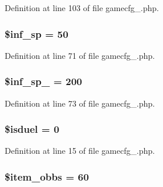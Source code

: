 Definition at line 103 of file gamecfg\+\_.\+php.

\hypertarget{gamecfg__1_8php_ad018a98e2b1be069c9d6427efdb07247}{
\subsubsection[{\$inf\+\_\+sp}]{\setlength{\rightskip}{0pt plus 5cm}\$inf\+\_\+sp = 50}}\label{gamecfg__1_8php_ad018a98e2b1be069c9d6427efdb07247}


Definition at line 71 of file gamecfg\+\_.\+php.

\hypertarget{gamecfg__1_8php_ad873d3b143c0a4744aee90f33c76ef9c}{
\subsubsection[{\$inf\+\_\+sp\+\_\+2}]{\setlength{\rightskip}{0pt plus 5cm}\$inf\+\_\+sp\+\_ = 200}}\label{gamecfg__1_8php_ad873d3b143c0a4744aee90f33c76ef9c}


Definition at line 73 of file gamecfg\+\_.\+php.

\hypertarget{gamecfg__1_8php_a9e4e61c4d8c2ec483860269be77d4054}{
\subsubsection[{\$isduel}]{\setlength{\rightskip}{0pt plus 5cm}\$isduel = 0}}\label{gamecfg__1_8php_a9e4e61c4d8c2ec483860269be77d4054}


Definition at line 15 of file gamecfg\+\_.\+php.

\hypertarget{gamecfg__1_8php_a8e0c351836ca891237ccdf99d4ba43db}{
\subsubsection[{\$item\+\_\+obbs}]{\setlength{\rightskip}{0pt plus 5cm}\$item\+\_\+obbs = 60}}\label{gamecfg__1_8php_a8e0c351836ca891237ccdf99d4ba43db}


